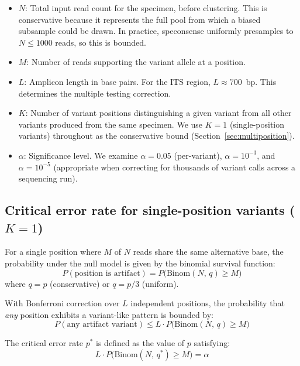 \documentclass[11pt]{article}
\begin{document}
\begin{itemize}
\item $N$: Total input read count for the specimen, before clustering. This is
conservative because it represents the full pool from which a biased subsample
could be drawn. In practice, speconsense uniformly presamples to $N \leq 1000$
reads, so this is bounded.

\item $M$: Number of reads supporting the variant allele at a position.

\item $L$: Amplicon length in base pairs. For the ITS region, $L \approx 700$~bp.
This determines the multiple testing correction.

\item $K$: Number of variant positions distinguishing a given variant from all
other variants produced from the same specimen. We use $K = 1$ (single-position
variants) throughout as the conservative bound (Section~\ref{sec:multiposition}).

\item $\alpha$: Significance level. We examine $\alpha = 0.05$ (per-variant),
$\alpha = 10^{-3}$, and $\alpha = 10^{-5}$ (appropriate when correcting for
thousands of variant calls across a sequencing run).
\end{itemize}

\subsection{Critical error rate for single-position variants ($K = 1$)}

For a single position where $M$ of $N$ reads share the same alternative base,
the probability under the null model is given by the binomial survival function:
\begin{equation}
P(\text{position is artifact}) = P\bigl(\text{Binom}(N,\, q) \geq M\bigr)
\end{equation}
where $q = p$ (conservative) or $q = p/3$ (uniform).

With Bonferroni correction over $L$ independent positions, the probability that
\emph{any} position exhibits a variant-like pattern is bounded by:
\begin{equation}
P(\text{any artifact variant}) \leq L \cdot P\bigl(\text{Binom}(N,\, q) \geq M\bigr)
\end{equation}

The critical error rate $p^*$ is defined as the value of $p$ satisfying:
\begin{equation}
\label{eq:critical}
L \cdot P\bigl(\text{Binom}(N,\, q^*) \geq M\bigr) = \alpha
\end{equation}
\end{document}

